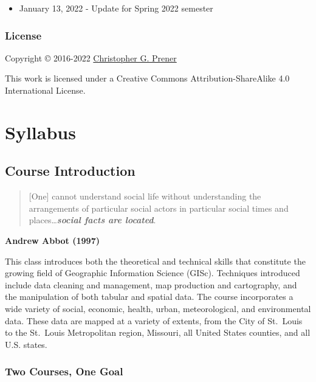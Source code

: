 \documentclass[
]{book}
\providecommand{\tightlist}{%
  \setlength{\itemsep}{0pt}\setlength{\parskip}{0pt}}
\begin{document}
\begin{itemize}
\tightlist
\item
  January 13, 2022 - Update for Spring 2022 semester
\end{itemize}

\hypertarget{license}{%
\section*{License}\label{license}}

Copyright © 2016-2022 \href{https://chris-prener.github.io}{Christopher G. Prener}

This work is licensed under a Creative Commons Attribution-ShareAlike 4.0 International License.

\hypertarget{part-syllabus}{%
\part{Syllabus}\label{part-syllabus}}

\hypertarget{course-introduction}{%
\chapter{Course Introduction}\label{course-introduction}}

\begin{quote}
{[}One{]} cannot understand social life without understanding the arrangements of particular social actors in particular social times and places\ldots{}\textbf{\emph{social facts are located}}.
\end{quote}

\textbf{Andrew Abbot (1997)}

This class introduces both the theoretical and technical skills that constitute the growing field of Geographic Information Science (GISc). Techniques introduced include data cleaning and management, map production and cartography, and the manipulation of both tabular and spatial data. The course incorporates a wide variety of social, economic, health, urban, meteorological, and environmental data. These data are mapped at a variety of extents, from the City of St.~Louis to the St.~Louis Metropolitan region, Missouri, all United States counties, and all U.S. states.

\hypertarget{two-courses-one-goal}{%
\section{Two Courses, One Goal}\label{two-courses-one-goal}}
\end{document}
